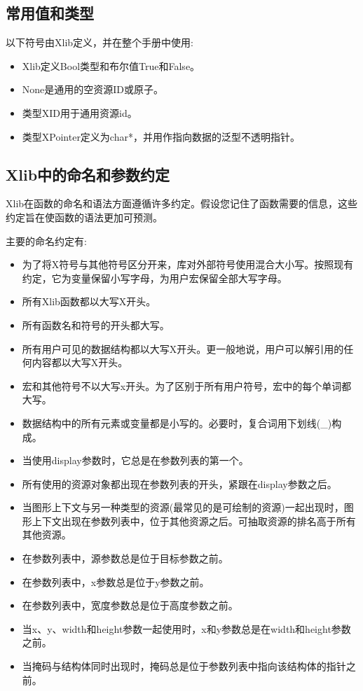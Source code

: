 \subsection{常用值和类型}

\noindent 以下符号由Xlib定义，并在整个手册中使用:
\begin{itemize}
	\item Xlib定义Bool类型和布尔值True和False。
	\item None是通用的空资源ID或原子。
	\item 类型XID用于通用资源id。
	\item 类型XPointer定义为char*，并用作指向数据的泛型不透明指针。
\end{itemize}

\subsection{Xlib中的命名和参数约定}

Xlib在函数的命名和语法方面遵循许多约定。假设您记住了函数需要的信息，这些约定旨在使函数的语法更加可预测。

\noindent 主要的命名约定有:

\begin{itemize}
	\item 为了将X符号与其他符号区分开来，库对外部符号使用混合大小写。按照现有约定，它为变量保留小写字母，为用户宏保留全部大写字母。
	\item 所有Xlib函数都以大写X开头。
	\item 所有函数名和符号的开头都大写。
	\item 所有用户可见的数据结构都以大写X开头。更一般地说，用户可以解引用的任何内容都以大写X开头。
	\item 宏和其他符号不以大写x开头。为了区别于所有用户符号，宏中的每个单词都大写。
	\item 数据结构中的所有元素或变量都是小写的。必要时，复合词用下划线(\_)构成。
	\item 当使用display参数时，它总是在参数列表的第一个。
	\item 所有使用的资源对象都出现在参数列表的开头，紧跟在display参数之后。
	\item 当图形上下文与另一种类型的资源(最常见的是可绘制的资源)一起出现时，图形上下文出现在参数列表中，位于其他资源之后。可抽取资源的排名高于所有其他资源。
	\item 在参数列表中，源参数总是位于目标参数之前。
	\item 在参数列表中，x参数总是位于y参数之前。
	\item 在参数列表中，宽度参数总是位于高度参数之前。
	\item 当x、y、width和height参数一起使用时，x和y参数总是在width和height参数之前。
	\item 当掩码与结构体同时出现时，掩码总是位于参数列表中指向该结构体的指针之前。
\end{itemize}

